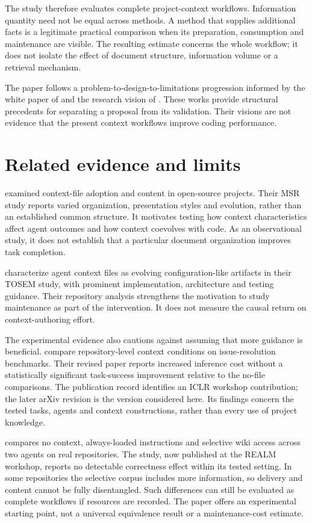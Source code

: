 \documentclass[11pt,letterpaper,twocolumn]{article}
\begin{document}
The study therefore evaluates complete project-context workflows. Information quantity need not be equal across methods. A method that supplies additional facts is a legitimate practical comparison when its preparation, consumption and maintenance are visible. The resulting estimate concerns the whole workflow; it does not isolate the effect of document structure, information volume or a retrieval mechanism.

The paper follows a problem-to-design-to-limitations progression informed by the white paper of \citet{esposito2024} and the research vision of \citet{hassan2026}. These works provide structural precedents for separating a proposal from its validation. Their visions are not evidence that the present context workflows improve coding performance.

\section{Related evidence and limits}
\citet{mohsenimofidi2026} examined context-file adoption and content in open-source projects. Their MSR study reports varied organization, presentation styles and evolution, rather than an established common structure. It motivates testing how context characteristics affect agent outcomes and how context coevolves with code. As an observational study, it does not establish that a particular document organization improves task completion.

\citet{chatlatanagulchai2026} characterize agent context files as evolving configuration-like artifacts in their TOSEM study, with prominent implementation, architecture and testing guidance. Their repository analysis strengthens the motivation to study maintenance as part of the intervention. It does not measure the causal return on context-authoring effort.

The experimental evidence also cautions against assuming that more guidance is beneficial. \citet{gloaguen2026} compare repository-level context conditions on issue-resolution benchmarks. Their revised paper reports increased inference cost without a statistically significant task-success improvement relative to the no-file comparisons. The publication record identifies an ICLR workshop contribution; the later arXiv revision is the version considered here. Its findings concern the tested tasks, agents and context constructions, rather than every use of project knowledge.

\citet{khatri2026} compares no context, always-loaded instructions and selective wiki access across two agents on real repositories. The study, now published at the REALM workshop, reports no detectable correctness effect within its tested setting. In some repositories the selective corpus includes more information, so delivery and content cannot be fully disentangled. Such differences can still be evaluated as complete workflows if resources are recorded. The paper offers an experimental starting point, not a universal equivalence result or a maintenance-cost estimate.
\end{document}
